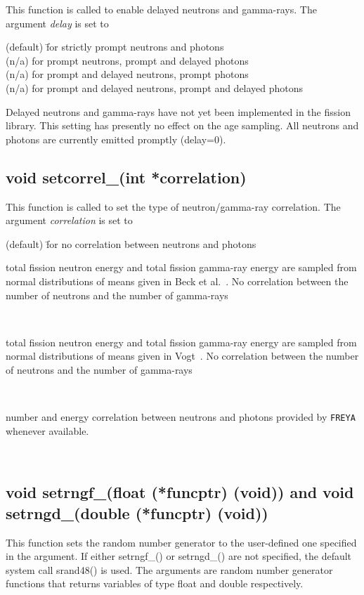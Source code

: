 This function is called to enable delayed neutrons and gamma-rays. The argument \textit{delay} is set to 

\begin{tabbing}
 (default) \= for strictly prompt neutrons and photons \\
 (n/a) \> for prompt neutrons, prompt and delayed photons \\
 (n/a) \> for prompt and delayed neutrons, prompt photons \\
 (n/a) \> for prompt and delayed neutrons, prompt and delayed photons \\
\end{tabbing}

Delayed neutrons and gamma-rays have not yet been implemented in the fission library. This setting has presently no effect on the age sampling. All neutrons and photons are currently emitted promptly (delay=0).

\subsection*{void setcorrel\_(int *correlation)}\label{setcorrel}

This function is called to set the type of neutron/gamma-ray correlation.  The argument \textit{correlation} is set to

\begin{tabbing}
 (default) \= for no correlation between neutrons and photons \\
 \> \parbox[t]{5.5in}{total fission neutron energy and total fission gamma-ray energy are sampled from normal distributions of means given in Beck et al.~\cite{Beck 2007}. No correlation between the number of neutrons and the number of gamma-rays} \\
 \> \parbox[t]{5.5in}{total fission neutron energy and total fission gamma-ray energy are sampled from normal distributions of means given in Vogt~\cite{Vogt 2008}. No correlation between the number of neutrons and the number of gamma-rays} \\
 \> \parbox[t]{5.5in}{number and energy correlation between neutrons and photons provided by {\tt FREYA} whenever available.} \\
\end{tabbing}



\subsection*{void setrngf\_(float (*funcptr) (void)) and void setrngd\_(double (*funcptr) (void))}

This function sets the random number generator to the user-defined
one specified in the argument. If either setrngf\_() or setrngd\_() are
not specified, the default system call srand48() is used. The 
arguments are random number generator functions that returns 
variables of type float and double respectively.
